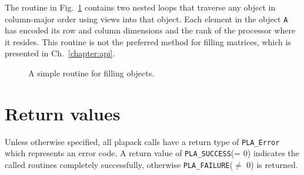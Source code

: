 The routine in Fig.~\ref{code:fill} contains two nested loops that traverse 
any object in column-major order using views into that object.  
Each element in the
object {\tt A} has encoded its row and column dimensions
and the rank of the processor where it resides.
This routine is not the preferred method for filling matrices,
which is presented in Ch.~\ref{chapter:api}.
\begin{figure}[htp]
\center
{}
\caption{A simple routine for filling objects.}
\label{code:fill}
\end{figure}


\section{Return values}

Unless otherwise specified, all plapack calls have a return type of 
{\tt PLA\_Error} which represents an error code.  
A return value of {\tt PLA\_SUCCESS}(= 0)
indicates the called routines completely successfully, otherwise
{\tt PLA\_FAILURE}($\neq$ 0) is returned.
